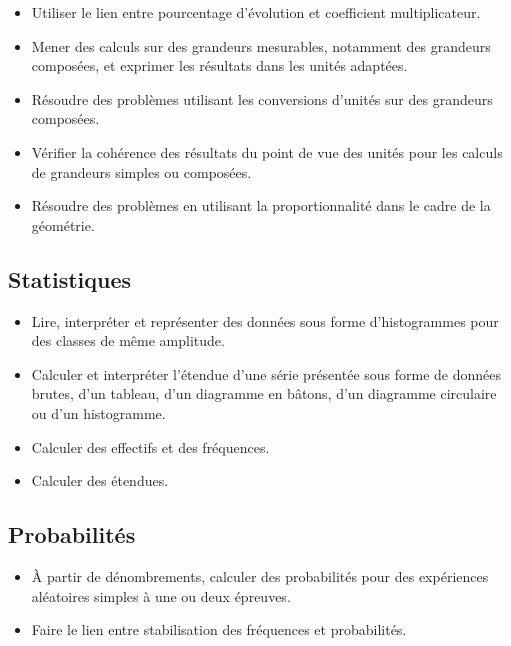 \documentclass[a4paper,12pt,fleqn]{article}	
\begin{document}
\begin{itemize}
	\item {}Utiliser le lien entre pourcentage d’évolution et coefficient multiplicateur.
	\item {}Mener des calculs sur des grandeurs mesurables, notamment des grandeurs composées, et exprimer les résultats dans les unités adaptées.
	\item {}Résoudre des problèmes utilisant les conversions d’unités sur des grandeurs composées.
	\item {}Vérifier la cohérence des résultats du point de vue des unités pour les calculs de grandeurs simples ou composées.
	\item {}Résoudre des problèmes en utilisant la proportionnalité dans le cadre de la géométrie.
\end{itemize}

\subsection*{Statistiques}

\begin{itemize}
	\item {}Lire, interpréter et représenter des données sous forme d’histogrammes pour des classes de même amplitude.
	\item {}Calculer et interpréter l’étendue d’une série présentée sous forme de données brutes, d’un tableau, d’un diagramme en bâtons, d’un diagramme circulaire ou d’un histogramme.
	\item {}Calculer des effectifs et des fréquences.
	\item {}Calculer des étendues.
\end{itemize}

\subsection*{Probabilités}

\begin{itemize}
	\item {}À partir de dénombrements, calculer des probabilités pour des expériences aléatoires simples à une ou deux épreuves.
	\item {}Faire le lien entre stabilisation des fréquences et probabilités.
\end{itemize}
	
\end{document}
